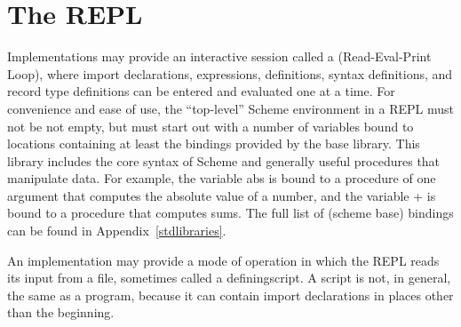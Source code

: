 \section{The REPL}

Implementations may provide an interactive session called a
 (Read-Eval-Print Loop), where import declarations,
expressions, definitions, syntax definitions, and record type definitions can be
entered and evaluated one at a time.  For convenience and ease of use,
the ``top-level'' Scheme environment in a REPL
must not be not empty, but must start out with a number of variables
bound to locations containing at least the bindings provided by the
base library.  This library includes the core syntax of Scheme
and generally useful procedures that manipulate data.  For example, the
variable {\cf abs} is bound to a
procedure of one argument that computes the absolute value of a
number, and the variable {\cf +} is bound to a procedure that computes
sums.  The full list of {\cf(scheme base)} bindings can be found in
Appendix~\ref{stdlibraries}.

An implementation may provide a mode of operation in which the REPL
reads its input from a file, sometimes called a defining{script}.  A script is not, in general, the same
as a program, because it can contain import declarations in places other than
the beginning.

